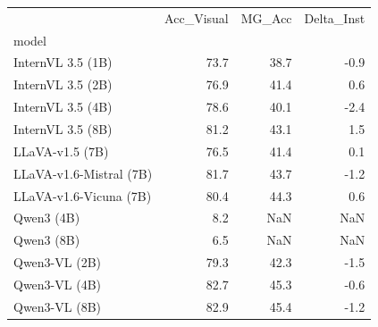 \begin{tabular}{lrrr}
\toprule
 & Acc_Visual & MG_Acc & Delta_Inst \\
model &  &  &  \\
\midrule
InternVL 3.5 (1B) & 73.7 & 38.7 & -0.9 \\
InternVL 3.5 (2B) & 76.9 & 41.4 & 0.6 \\
InternVL 3.5 (4B) & 78.6 & 40.1 & -2.4 \\
InternVL 3.5 (8B) & 81.2 & 43.1 & 1.5 \\
LLaVA-v1.5 (7B) & 76.5 & 41.4 & 0.1 \\
LLaVA-v1.6-Mistral (7B) & 81.7 & 43.7 & -1.2 \\
LLaVA-v1.6-Vicuna (7B) & 80.4 & 44.3 & 0.6 \\
Qwen3 (4B) & 8.2 & NaN & NaN \\
Qwen3 (8B) & 6.5 & NaN & NaN \\
Qwen3-VL (2B) & 79.3 & 42.3 & -1.5 \\
Qwen3-VL (4B) & 82.7 & 45.3 & -0.6 \\
Qwen3-VL (8B) & 82.9 & 45.4 & -1.2 \\
\bottomrule
\end{tabular}
